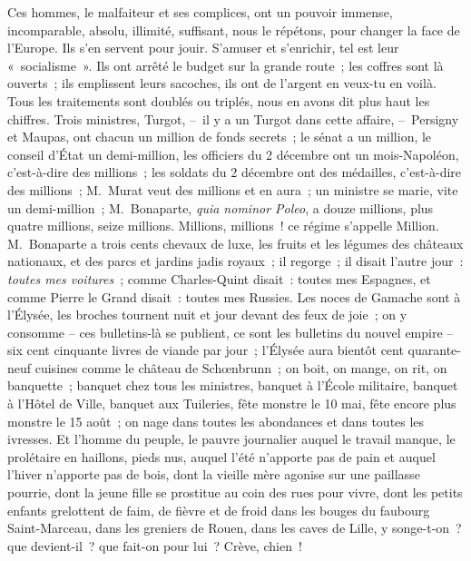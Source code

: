 \documentclass[french,twoside]{book} %
\begin{document}
Ces hommes, le malfaiteur et ses complices, ont un pouvoir immense, incomparable, absolu, illimité, suffisant, nous le répétons, pour changer la face de l’Europe. Ils s’en servent pour jouir. S’amuser et s’enrichir, tel est leur « socialisme ». Ils ont arrêté le budget sur la grande route ; les coffres sont là ouverts ; ils emplissent leurs sacoches, ils ont de l’argent en veux-tu en voilà. Tous les traitements sont doublés ou triplés, nous en avons dit plus haut les chiffres. Trois ministres, Turgot, – il y a un Turgot dans cette affaire, – Persigny et Maupas, ont chacun un million de fonds secrets ; le sénat a un million, le conseil d’État un demi-million, les officiers du 2 décembre ont un mois-Napoléon, c’est-à-dire des millions ; les soldats du 2 décembre ont des médailles, c’est-à-dire des millions ; M. Murat veut des millions et en aura ; un ministre se marie, vite un demi-million ; M. Bonaparte, \emph{quia nominor Poleo}, a douze millions, plus quatre millions, seize millions. Millions, millions ! ce régime s’appelle Million. M. Bonaparte a trois cents chevaux de luxe, les fruits et les légumes des châteaux nationaux, et des parcs et jardins jadis royaux ; il regorge ; il disait l’autre jour : \emph{toutes mes voitures} ; comme Charles-Quint disait : toutes mes Espagnes, et comme Pierre le Grand disait : toutes mes Russies. Les noces de Gamache sont à l’Élysée, les broches tournent nuit et jour devant des feux de joie ; on y consomme – ces bulletins-là se publient, ce sont les bulletins du nouvel empire – six cent cinquante livres de viande par jour ; l’Élysée aura bientôt cent quarante-neuf cuisines comme le château de Schœnbrunn ; on boit, on mange, on rit, on banquette ; banquet chez tous les ministres, banquet à l’École militaire, banquet à l’Hôtel de Ville, banquet aux Tuileries, fête monstre le 10 mai, fête encore plus monstre le 15 août ; on nage dans toutes les abondances et dans toutes les ivresses. Et l’homme du peuple, le pauvre journalier auquel le travail manque, le prolétaire en haillons, pieds nus, auquel l’été n’apporte pas de pain et auquel l’hiver n’apporte pas de bois, dont la vieille mère agonise sur une paillasse pourrie, dont la jeune fille se prostitue au coin des rues pour vivre, dont les petits enfants grelottent de faim, de fièvre et de froid dans les bouges du faubourg Saint-Marceau, dans les greniers de Rouen, dans les caves de Lille, y songe-t-on ? que devient-il ? que fait-on pour lui ? Crève, chien !
\end{document}
